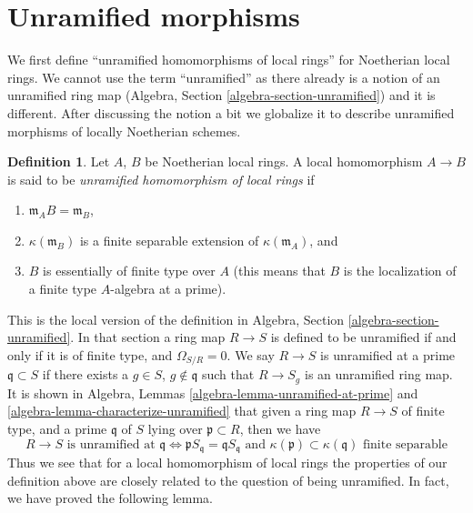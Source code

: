 \documentclass{stacks-project}
\theoremstyle{plain}
\theoremstyle{definition}
\newtheorem{definition}[subsection]{Definition}
\theoremstyle{remark}
\numberwithin{equation}{subsection}
\begin{document}
\section{Unramified morphisms}
\label{section-unramified-definition}

\noindent
We first define ``unramified homomorphisms of local rings'' for Noetherian
local rings. We cannot use the term ``unramified'' as there already is
a notion of
an unramified ring map (Algebra, Section \ref{algebra-section-unramified})
and it is different. After discussing the notion a bit we
globalize it to describe unramified morphisms of locally Noetherian schemes.

\begin{definition}
\label{definition-unramified-rings}
Let $A$, $B$ be Noetherian local rings. A local homomorphism $A \to B$
is said to be {\it unramified homomorphism of local rings} if
\begin{enumerate}
\item $\mathfrak m_AB = \mathfrak m_B$,
\item $\kappa(\mathfrak m_B)$ is a finite separable extension of
$\kappa(\mathfrak m_A)$, and
\item $B$ is essentially of finite type over $A$ (this means
that $B$ is the localization of a finite type $A$-algebra at a prime).
\end{enumerate}
\end{definition}

\noindent
This is the local version of the
definition in Algebra, Section \ref{algebra-section-unramified}.
In that section a ring map $R \to S$ is defined to be unramified if and
only if it is of finite type, and $\Omega_{S/R} = 0$.
We say $R \to S$ is unramified at a prime $\mathfrak q \subset S$
if there exists a $g \in S$, $g \not \in \mathfrak q$ such that
$R \to S_g$ is an unramified ring map. It is shown in
Algebra, Lemmas \ref{algebra-lemma-unramified-at-prime} and
\ref{algebra-lemma-characterize-unramified} that given a ring
map $R \to S$ of finite type, and a prime $\mathfrak q$ of $S$
lying over $\mathfrak p \subset R$, then we have
$$
R \to S\text{ is unramified at }\mathfrak q
\Leftrightarrow
\mathfrak pS_{\mathfrak q} = \mathfrak q S_{\mathfrak q}
\text{ and }
\kappa(\mathfrak p) \subset \kappa(\mathfrak q)\text{ finite separable}
$$
Thus we see that for a local homomorphism of local rings the properties
of our definition above are closely related to the question of
being unramified. In fact, we have proved the following lemma.
\end{document}
